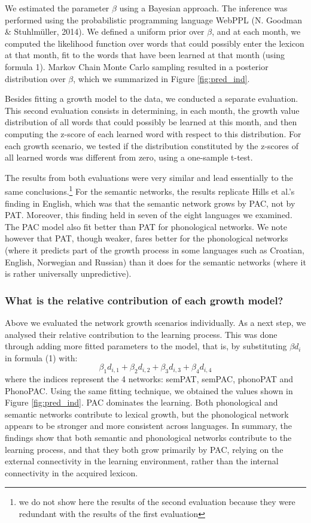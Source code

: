 \documentclass[10pt, letterpaper]{article}
\begin{document}
We estimated the parameter \(\beta\) using a Bayesian approach. The
inference was performed using the probabilistic programming language
WebPPL (N. Goodman \& Stuhlmüller, 2014). We defined a uniform prior
over \(\beta\), and at each month, we computed the likelihood function
over words that could possibly enter the lexicon at that month, fit to
the words that have been learned at that month (using formula 1). Markov
Chain Monte Carlo sampling resulted in a posterior distribution over
\(\beta\), which we summarized in Figure \ref{fig:pred_ind}.

Besides fitting a growth model to the data, we conducted a separate
evaluation. This second evaluation consists in determining, in each
month, the growth value distribution of all words that could possibly be
learned at this month, and then computing the z-score of each learned
word with respect to this distribution. For each growth scenario, we
tested if the distribution constituted by the z-scores of all learned
words was different from zero, using a one-sample t-test.

The results from both evaluations were very similar and lead essentially
to the same
conclusions.\footnote{we do not show here the results of the second evaluation because they were redundant with the results of the first evaluation}
For the semantic networks, the results replicate Hills et al.'s finding
in English, which was that the semantic network grows by PAC, not by
PAT. Moreover, this finding held in seven of the eight languages we
examined. The PAC model also fit better than PAT for phonological
networks. We note however that PAT, though weaker, fares better for the
phonological networks (where it predicts part of the growth process in
some languages such as Croatian, English, Norwegian and Russian) than it
does for the semantic networks (where it is rather universally
unpredictive).

\subsubsection{What is the relative contribution of each growth
model?}\label{what-is-the-relative-contribution-of-each-growth-model}

Above we evaluated the network growth scenarios individually. As a next
step, we analysed their relative contribution to the learning process.
This was done through adding more fitted parameters to the model, that
is, by substituting \(\beta d_i\) in formula (1) with:
\[\beta_{1} d_{i, 1} + \beta_{2} d_{i, 2} + \beta_{3} d_{i, 3} + \beta_{4} d_{i, 4}\]
where the indices represent the 4 networks: semPAT, semPAC, phonoPAT and
PhonoPAC. Using the same fitting technique, we obtained the values shown
in Figure \ref{fig:pred_ind}. PAC dominates the learning. Both
phonological and semantic networks contribute to lexical growth, but the
phonological network appears to be stronger and more consistent across
languages. In summary, the findings show that both semantic and
phonological networks contribute to the learning process, and that they
both grow primarily by PAC, relying on the external connectivity in the
learning environment, rather than the internal connectivity in the
acquired lexicon.
\end{document}
